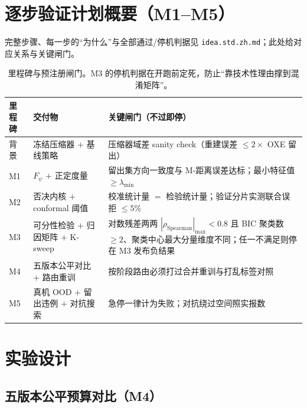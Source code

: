 \documentclass[11pt,a4paper]{ctexart}
\begin{document}
\section{逐步验证计划概要（M1--M5）}\label{sec:plan}

完整步骤、每一步的``为什么''与全部通过/停机判据见 \texttt{idea.std.zh.md}；此处给对应关系与关键闸门。

\begin{table}[h]
\centering\small
\begin{tabular}{@{}llp{7.6cm}@{}}
\toprule
里程碑 & 交付物 & 关键闸门（不过即停） \\
\midrule
背景 & 冻结压缩器 $+$ 基线策略 & 压缩器域差 sanity check（重建误差 $\le2\times$ OXE 留出） \\
M1 & $F_\psi$ $+$ 正定度量 & 留出集方向一致度与 M-距离误差达标；最小特征值 $\ge\lambda_{\min}$ \\
M2 & 否决内核 $+$ conformal 阈值 & 校准统计量 $=$ 检验统计量；验证分片实测联合误拒 $\le5\%$ \\
M3 & 可分性检验 $+$ 归因矩阵 $+$ K-sweep & 对数残差两两 $|\rho_{\mathrm{Spearman}}|_{\max}<0.8$ 且 BIC 聚类数 $\ge2$、聚类中心最大分量维度不同；任一不满足则停在 M3 发布负结果 \\
M4 & 五版本公平对比 $+$ 路由重训 & 按阶段路由必须打过合并重训与打乱标签对照 \\
M5 & 真机 OOD $+$ 留出违例 $+$ 对抗搜索 & 急停一律计为失败；对抗绕过空间照实报数 \\
\bottomrule
\end{tabular}
\caption{里程碑与预注册闸门。M3 的停机判据在开跑前定死，防止``靠技术性理由撑到混淆矩阵''。}
\end{table}

\section{实验设计}\label{sec:exp}

\subsection{五版本公平预算对比（M4）}
\end{document}
